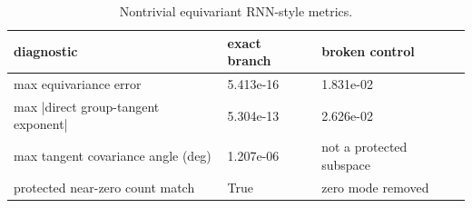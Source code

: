 \begin{table}[t]
\centering
\small
\caption{Nontrivial equivariant RNN-style metrics.}
\label{tab:nontrivial-equivariant-rnn}
\begin{tabular}{lll}
\toprule
diagnostic & exact branch & broken control \\
\midrule
max equivariance error & 5.413e-16 & 1.831e-02 \\
max |direct group-tangent exponent| & 5.304e-13 & 2.626e-02 \\
max tangent covariance angle (deg) & 1.207e-06 & not a protected subspace \\
protected near-zero count match & True & zero mode removed \\
\bottomrule
\end{tabular}
\end{table}
